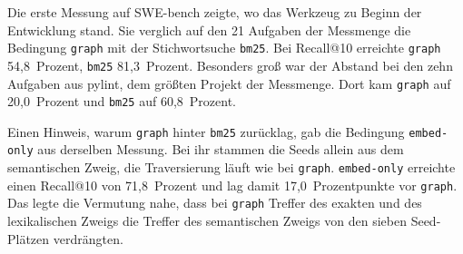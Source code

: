 %
Die erste Messung auf SWE-bench zeigte, wo das Werkzeug zu Beginn der Entwicklung stand. Sie verglich auf den 21 Aufgaben der Messmenge die Bedingung \texttt{graph} mit der Stichwortsuche \texttt{bm25}. Bei Recall@10 erreichte \texttt{graph} 54,8~Prozent, \texttt{bm25} 81,3~Prozent. Besonders groß war der Abstand bei den zehn Aufgaben aus pylint, dem größten Projekt der Messmenge. Dort kam \texttt{graph} auf 20,0~Prozent und \texttt{bm25} auf 60,8~Prozent.

Einen Hinweis, warum \texttt{graph} hinter \texttt{bm25} zurücklag, gab die Bedingung \texttt{embed-only} aus derselben Messung. Bei ihr stammen die Seeds allein aus dem semantischen Zweig, die Traversierung läuft wie bei \texttt{graph}. \texttt{embed-only} erreichte einen Recall@10 von 71,8~Prozent und lag damit 17,0~Prozentpunkte vor \texttt{graph}. Das legte die Vermutung nahe, dass bei \texttt{graph} Treffer des exakten und des lexikalischen Zweigs die Treffer des semantischen Zweigs von den sieben Seed-Plätzen verdrängten.

